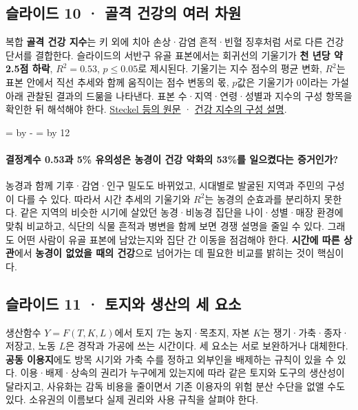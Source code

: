 \documentclass[10pt,a4paper]{article}
\newcommand{\ReserveQuestionSpace}{%
  \par\begingroup
  \dimen0=\pagegoal \advance\dimen0 by -\pagetotal
  \dimen2=\baselineskip \multiply\dimen2 by 12
  \ifdim\dimen0<\dimen2 \newpage\fi
  \endgroup}
\begin{document}
\subsection{슬라이드 10 · 골격 건강의 여러 차원}
복합 \textbf{골격 건강 지수}는 키 외에 치아 손상·감염 흔적·빈혈 징후처럼 서로 다른 건강 단서를 결합한다. 슬라이드의 서반구 유골 표본에서는 회귀선의 기울기가 \textbf{천 년당 약 2.5점 하락}, $R^2=0.53$, $p\leq0.05$로 제시된다. 기울기는 지수 점수의 평균 변화, $R^2$는 표본 안에서 직선 추세와 함께 움직이는 점수 변동의 몫, $p$값은 기울기가 0이라는 가설 아래 관찰된 결과의 드묾을 나타낸다. 표본 수·지역·연령·성별과 지수의 구성 항목을 확인한 뒤 해석해야 한다. \href{https://doi.org/10.1002/evan.10030}{Steckel 등의 원문} · \href{https://www.cambridge.org/core/books/abs/backbone-of-history/health-index-from-skeletal-remains/D42E55431F66B8133382116AEEF6A0FD}{건강 지수의 구성 설명}.\par

\ReserveQuestionSpace
\paragraph{결정계수 0.53과 5\% 유의성은 농경이 건강 악화의 53\%를 일으켰다는 증거인가?}
농경과 함께 기후·감염·인구 밀도도 바뀌었고, 시대별로 발굴된 지역과 주민의 구성이 다를 수 있다. 따라서 시간 추세의 기울기와 $R^2$는 농경의 순효과를 분리하지 못한다. 같은 지역의 비슷한 시기에 살았던 농경·비농경 집단을 나이·성별·매장 환경에 맞춰 비교하고, 식단의 식물 흔적과 병변을 함께 보면 경쟁 설명을 줄일 수 있다. 그래도 어떤 사람이 유골 표본에 남았는지와 집단 간 이동을 점검해야 한다. \textbf{시간에 따른 상관}에서 \textbf{농경이 없었을 때의 건강}으로 넘어가는 데 필요한 비교를 밝히는 것이 핵심이다.\par

\subsection{슬라이드 11 · 토지와 생산의 세 요소}
생산함수 $Y=F(T,K,L)$에서 토지 $T$는 농지·목초지, 자본 $K$는 쟁기·가축·종자·저장고, 노동 $L$은 경작과 가공에 쓰는 시간이다. 세 요소는 서로 보완하거나 대체한다. \textbf{공동 이용지}에도 방목 시기와 가축 수를 정하고 외부인을 배제하는 규칙이 있을 수 있다. 이용·배제·상속의 권리가 누구에게 있는지에 따라 같은 토지와 도구의 생산성이 달라지고, 사유화는 감독 비용을 줄이면서 기존 이용자의 위험 분산 수단을 없앨 수도 있다. 소유권의 이름보다 실제 권리와 사용 규칙을 살펴야 한다.\par
\end{document}
